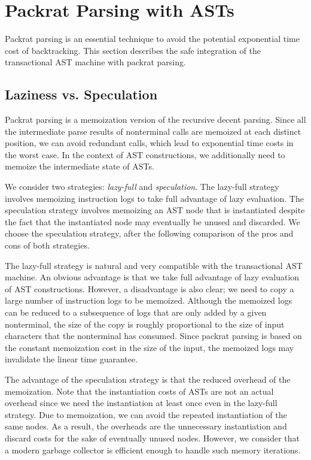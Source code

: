 \documentclass[JIP]{ipsj}
\begin{document}
\section{Packrat Parsing with ASTs}

Packrat parsing\cite{ICFP02_PackratParsing} is an essential technique to avoid the potential exponential time cost of backtracking. This section describes the safe integration of  the transactional AST machine with packrat parsing.

\subsection{Laziness vs. Speculation}

Packrat parsing \cite{ICFP02_PackratParsing} is a memoization version of the recursive decent parsing. Since all the intermediate parse results of nonterminal calls are memoized at each distinct position, we can avoid redundant calls, which lead to exponential time costs in the worst case. In the context of AST constructions, we additionally need to memoize the intermediate state of ASTs.

We consider two strategies: {\em lazy-full} and {\em speculation}. The lazy-full strategy involves memoizing instruction logs to take full advantage of lazy evaluation. The speculation strategy involves memoizing an AST node that is instantiated despite the fact that the instantiated node may eventually be unused and discarded. We choose the speculation strategy, after the following comparison of the pros and cons of both strategies. 

The lazy-full strategy is natural and very compatible with the transactional AST machine. An obvious advantage is that we take full advantage of lazy evaluation of AST constructions. However, a disadvantage is also clear;  we need to copy a large number of instruction logs to be memoized. Although the memoized logs can be reduced to a subsequence of logs that are only added by a given nonterminal, the size of the copy is roughly proportional to the size of input characters that the nonterminal has consumed. Since packrat parsing is based on the constant memoization cost in the size of the input, the memoized logs may invalidate the linear time guarantee. 

The advantage of the speculation strategy is that the reduced overhead of the memoization. Note that the instantiation costs of ASTs are not an actual overhead since we need the instantiation at least once even in the lazy-full strategy. Due to memoization, we can avoid the repeated instantiation of the same nodes. As a result, the overheads are the unnecessary instantiation and discard costs for the sake of eventually unused nodes. However, we consider that a modern garbage collector is efficient enough to handle such memory iterations. 
\end{document}
